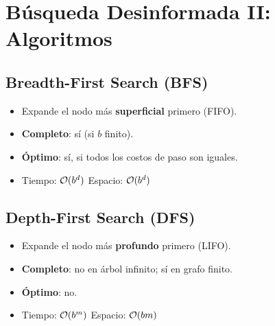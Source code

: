 \section{Búsqueda Desinformada II: Algoritmos}

\subsection{Breadth-First Search (BFS)}

\begin{itemize}
    \item Expande el nodo más \textbf{superficial} primero (FIFO).
    \item \textbf{Completo}: sí (si $b$ finito).
    \item \textbf{Óptimo}: sí, si todos los costos de paso son iguales.
    \item Tiempo: $\mathcal{O}(b^d)$ \quad Espacio: $\mathcal{O}(b^d)$
\end{itemize}

\subsection{Depth-First Search (DFS)}

\begin{itemize}
    \item Expande el nodo más \textbf{profundo} primero (LIFO).
    \item \textbf{Completo}: no en árbol infinito; sí en grafo finito.
    \item \textbf{Óptimo}: no.
    \item Tiempo: $\mathcal{O}(b^m)$ \quad Espacio: $\mathcal{O}(bm)$
\end{itemize}

